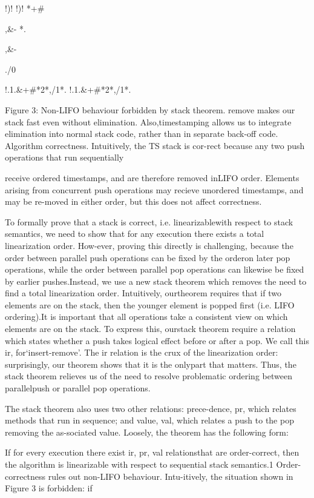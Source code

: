 !)!%
!)!%
*+#

,&-
*.

,&-

./0

!.1.&+#*2*,/1*.
!.1.&+#*2*,/1*.

Figure 3: Non-LIFO behaviour forbidden by stack theorem.
remove makes our stack fast even without elimination. Also,timestamping allows us to integrate elimination into normal
stack code, rather than in separate back-off code.
Algorithm correctness. Intuitively, the TS stack is cor-rect because any two push operations that run sequentially

receive ordered timestamps, and are therefore removed inLIFO order. Elements arising from concurrent push operations may recieve unordered timestamps, and may be re-moved in either order, but this does not affect correctness.

To formally prove that a stack is correct, i.e. linearizablewith respect to stack semantics, we need to show that for
any execution there exists a total linearization order. How-ever, proving this directly is challenging, because the order
between parallel push operations can be fixed by the orderon later pop operations, while the order between parallel
pop operations can likewise be fixed by earlier pushes.Instead, we use a new stack theorem which removes the
need to find a total linearization order. Intuitively, ourtheorem requires that if two elements are on the stack, then
the younger element is popped first (i.e. LIFO ordering).It is important that all operations take a consistent view
on which elements are on the stack. To express this, ourstack theorem require a relation which states whether a push
takes logical effect before or after a pop. We call this ir, for`insert-remove'. The ir relation is the crux of the linearization
order: surprisingly, our theorem shows that it is the onlypart that matters. Thus, the stack theorem relieves us of
the need to resolve problematic ordering between parallelpush or parallel pop operations.

The stack theorem also uses two other relations: prece-dence, pr, which relates methods that run in sequence; and
value, val, which relates a push to the pop removing the as-sociated value. Loosely, the theorem has the following form:

If for every execution there exist ir, pr, val relationsthat are order-correct, then the algorithm is linearizable with respect to sequential stack semantics.1
Order-correctness rules out non-LIFO behaviour. Intu-itively, the situation shown in Figure 3 is forbidden: if

